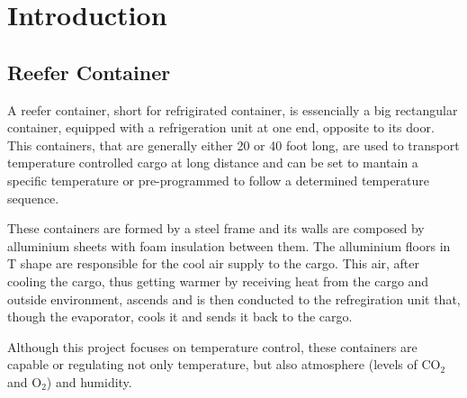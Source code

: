\documentclass[a4paper, 11pt]{article}
\begin{document}
\section{Introduction}

\subsection{Reefer Container}

A reefer container, short for refrigirated container, is essencially a big rectangular container, equipped with a refrigeration unit at one end, opposite to its door. This containers, that are generally either 20 or 40 foot long, are used to transport temperature controlled cargo at long distance and can be set to mantain a specific temperature or pre-programmed to follow a determined temperature sequence.

These containers are formed by a steel frame and its walls are composed by alluminium sheets with foam insulation between them. The alluminium floors in T shape are responsible for the cool air supply to the cargo. This air, after cooling the cargo, thus getting warmer by receiving heat from the cargo and outside environment, ascends and is then conducted to the refregiration unit that, though the evaporator, cools it and sends it back to the cargo. 

Although this project focuses on temperature control, these containers are capable or regulating not only temperature, but also atmosphere (levels of CO$_2$ and O$_2$) and humidity.  
\end{document}
